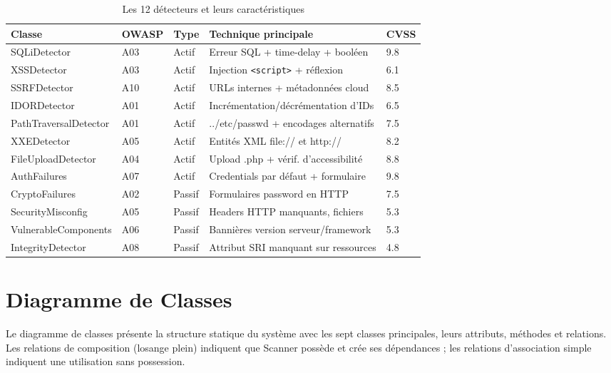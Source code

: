 \documentclass[12pt,a4paper]{report}
\newcommand{\code}[1]{\texttt{#1}}
\newcommand{\hdr}[1]{\cellcolor{gray!15}\textbf{#1}}
\newcommand{\rowA}{\rowcolor{gray!8}}
\begin{document}
\begin{table}[h!]
\centering
\caption{Les 12 détecteurs et leurs caractéristiques}
\begin{tabular}{p{4.5cm}p{1.2cm}p{1.5cm}p{4.5cm}p{1cm}}
\toprule
\hdr{Classe} & \hdr{OWASP} & \hdr{Type} & \hdr{Technique principale} & \hdr{CVSS} \\
\midrule
SQLiDetector          & A03 & Actif   & Erreur SQL + time-delay + booléen      & 9.8 \\
\rowA XSSDetector     & A03 & Actif   & Injection \code{<script>} + réflexion  & 6.1 \\
SSRFDetector          & A10 & Actif   & URLs internes + métadonnées cloud      & 8.5 \\
\rowA IDORDetector    & A01 & Actif   & Incrémentation/décrémentation d'IDs    & 6.5 \\
PathTraversalDetector & A01 & Actif   & ../etc/passwd + encodages alternatifs  & 7.5 \\
\rowA XXEDetector     & A05 & Actif   & Entités XML file:// et http://         & 8.2 \\
FileUploadDetector    & A04 & Actif   & Upload .php + vérif. d'accessibilité   & 8.8 \\
\rowA AuthFailures    & A07 & Actif   & Credentials par défaut + formulaire    & 9.8 \\
CryptoFailures        & A02 & Passif  & Formulaires password en HTTP           & 7.5 \\
\rowA SecurityMisconfig & A05 & Passif & Headers HTTP manquants, fichiers       & 5.3 \\
VulnerableComponents  & A06 & Passif  & Bannières version serveur/framework    & 5.3 \\
\rowA IntegrityDetector & A08 & Passif & Attribut SRI manquant sur ressources   & 4.8 \\
\bottomrule
\end{tabular}
\end{table}

\section{Diagramme de Classes}

Le diagramme de classes présente la structure statique du système avec les sept classes
principales, leurs attributs, méthodes et relations. Les relations de composition (losange
plein) indiquent que Scanner possède et crée ses dépendances ; les relations d'association
simple indiquent une utilisation sans possession.
\end{document}
